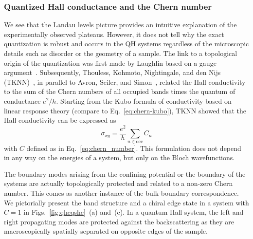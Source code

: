 \subsubsection{Quantized Hall conductance and the Chern number}
We see that the Landau levels picture provides an intuitive explanation of the experimentally observed plateaus. However, it does not tell why the exact quantization is robust and occurs in the QH systems regardless of the microscopic details such as disorder or the geometry of a sample. The link to a topological origin of the quantization was first made by Laughlin based on a gauge argument~\cite{PhysRevB.23.5632}. Subsequently, Thouless, Kohmoto, Nightingale, and den Nijs (TKNN)~\cite{PhysRevLett.49.405}, in parallel to Avron, Seiler, and Simon~\cite{PhysRevLett.51.51}, related the Hall conductivity to the sum of the Chern numbers of all occupied bands times the quantum of conductance $e^2 /h$. Starting from the Kubo formula of conductivity based on linear response theory (compare to Eq.~\eqref{eq:chern-kubo}), TKNN showed that the Hall conductivity can be expressed as
\begin{equation}
\sigma_{xy} = \frac{e^2}{h} \sum_{n \in \mathrm{occ}} C_n
\end{equation}
with $C$ defined as in Eq.~\eqref{eq:chern_number}. This formulation does not depend in any way on the energies of a system, but only on the Bloch wavefunctions.

The boundary modes arising from the confining potential or the boundary of the systems are actually topologically protected and related to a non-zero Chern number. This comes as another instance of the bulk-boundary correspondence. We pictorially present the band structure and a chiral edge state in a system with $C =1 $ in Figs.~\ref{fig:qheqshe}~(a) and~(c). In a quantum Hall system, the left and right propagating modes are protected against the backscattering as they are macroscopically spatially separated on opposite edges of the sample. 





